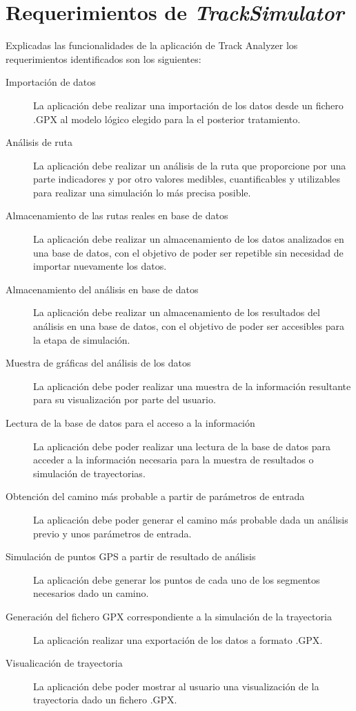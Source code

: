 \section{Requerimientos de \textit{TrackSimulator}} \label{section: RequerimientosTrackSimulator}
Explicadas las funcionalidades de la aplicación de Track Analyzer los requerimientos identificados son los siguientes:
\begin{description}
\item[Importación de datos] La aplicación debe realizar una importación de los datos desde un fichero .\ac{GPX} al modelo lógico elegido para la el posterior tratamiento.
\item[Análisis de ruta] La aplicación debe realizar un análisis de la ruta que proporcione por una parte indicadores y por otro valores medibles, cuantificables y utilizables para realizar una simulación 
lo más precisa posible.
\item[Almacenamiento de las rutas reales en base de datos] La aplicación debe realizar un almacenamiento de los datos analizados en una base de datos, con el objetivo de poder ser repetible
sin necesidad de importar nuevamente los datos.
\item[Almacenamiento del análisis en base de datos] La aplicación debe realizar un almacenamiento de los resultados del análisis en una base de datos, con el objetivo de poder ser accesibles para la
etapa de simulación.
\item[Muestra de gráficas del análisis de los datos] La aplicación debe poder realizar una muestra de la información resultante para su visualización por parte del usuario.
\item[Lectura de la base de datos para el acceso a la información] La aplicación debe poder realizar una lectura de la base de datos para acceder a la información necesaria para la muestra de resultados o 
simulación de trayectorias.
\item[Obtención del camino más probable a partir de parámetros de entrada] La aplicación debe poder generar el camino más probable dada un análisis previo y unos parámetros de entrada.
\item[Simulación de puntos \ac{GPS} a partir de resultado de análisis] La aplicación debe generar los puntos de cada uno de los segmentos necesarios dado un camino.
\item[Generación del fichero GPX correspondiente a la simulación de la trayectoria] La aplicación realizar una exportación de los datos a formato .\ac{GPX}.
\item[Visualicación de trayectoria] La aplicación debe poder mostrar al usuario una visualización de la trayectoria dado un fichero .\ac{GPX}.
\end{description}

